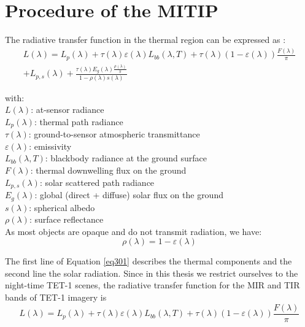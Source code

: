 
\section{Procedure of the MITIP}

The radiative transfer function in the thermal region can be expressed as \parencite{Reference304, Reference305}:
\begin{equation}
\begin{aligned}
\label{eq301}
L(\lambda) = L_p(\lambda) + \tau (\lambda) \varepsilon (\lambda) L_{bb}(\lambda, T) + \tau (\lambda) (1 - \varepsilon (\lambda)) \frac{F(\lambda)}{\pi}\\
+L_{p,s}(\lambda) + \frac{\tau (\lambda) E_g(\lambda) \frac{\rho (\lambda)}{\pi}}{1 - \rho (\lambda) s(\lambda)}
\end{aligned}
\end{equation}

\noindent with:\\
\indent $L(\lambda)$: at-sensor radiance\\
\indent $L_p(\lambda)$: thermal path radiance\\
\indent $\tau (\lambda)$: ground-to-sensor atmospheric transmittance\\
\indent $\varepsilon (\lambda)$: emissivity\\
\indent $L_{bb}(\lambda, T)$: blackbody radiance at the ground surface\\
\indent $F(\lambda)$: thermal downwelling flux on the ground\\
\indent $L_{p, s}(\lambda)$: solar scattered path radiance\\
\indent $E_g(\lambda)$: global (direct + diffuse) solar flux on the ground\\
\indent $s(\lambda)$: spherical albedo\\
\indent $\rho (\lambda)$: surface reflectance\\

\noindent As most objects are opaque and do not transmit radiation, we have:
\begin{equation}
\label{eq302}
\rho (\lambda) = 1 - \varepsilon (\lambda)
\end{equation}

\noindent The first line of Equation \eqref{eq301} describes the thermal components and the second line the solar radiation. Since in this thesis we restrict ourselves to the night-time TET-1 scenes, the radiative transfer function for the MIR and TIR bands of TET-1 imagery is
\begin{equation}
\label{eq303}
L(\lambda) = L_p(\lambda) + \tau (\lambda) \varepsilon (\lambda) L_{bb}(\lambda, T) + \tau (\lambda) (1 - \varepsilon (\lambda)) \frac{F(\lambda)}{\pi}
\end{equation}

